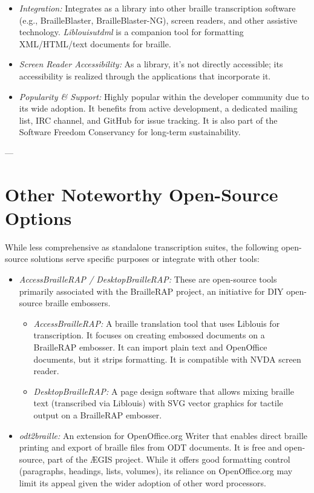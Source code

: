 \begin{itemize}
\begin{itemize}
        \item \emph{Integration:} Integrates as a library into other braille transcription software (e.g., BrailleBlaster, BrailleBlaster-NG), screen readers, and other assistive technology. \emph{Liblouisutdml} is a companion tool for formatting XML/HTML/text documents for braille.
        \item \emph{Screen Reader Accessibility:} As a library, it's not directly accessible; its accessibility is realized through the applications that incorporate it.
        \item \emph{Popularity \& Support:} Highly popular within the developer community due to its wide adoption. It benefits from active development, a dedicated mailing list, IRC channel, and GitHub for issue tracking. It is also part of the Software Freedom Conservancy for long-term sustainability.
    \end{itemize}
\end{itemize}

---

\section{Other Noteworthy Open-Source Options}
\label{sec:braille-other-open-source}
While less comprehensive as standalone transcription suites, the following open-source solutions serve specific purposes or integrate with other tools:

\begin{itemize}
    \item \emph{AccessBrailleRAP / DesktopBrailleRAP:} These are open-source tools primarily associated with the BrailleRAP project, an initiative for DIY open-source braille embossers.
    \begin{itemize}
        \item \emph{AccessBrailleRAP:} A braille translation tool that uses Liblouis for transcription. It focuses on creating embossed documents on a BrailleRAP embosser. It can import plain text and OpenOffice documents, but it strips formatting. It is compatible with NVDA screen reader\cite{BrailleRAPAccess}.
        \item \emph{DesktopBrailleRAP:} A page design software that allows mixing braille text (transcribed via Liblouis) with SVG vector graphics for tactile output on a BrailleRAP embosser\cite{BrailleRAPDesktop}.
    \end{itemize}
    \item \emph{odt2braille:} An extension for OpenOffice.org Writer that enables direct braille printing and export of braille files from ODT documents. It is free and open-source, part of the ÆGIS project. While it offers good formatting control (paragraphs, headings, lists, volumes), its reliance on OpenOffice.org may limit its appeal given the wider adoption of other word processors\footnotemark{}.
\end{itemize}

